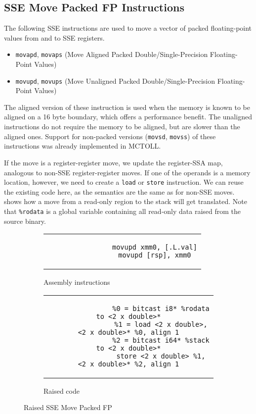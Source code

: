 \subsection{SSE Move Packed FP Instructions}\label{subsec:sse-move-packed-fp-instructions}

The following SSE instructions are used to move a vector of packed floating-point values from and to SSE registers.

\begin{itemize}
    \item \texttt{movapd}, \texttt{movaps} (Move Aligned Packed Double/Single-Precision Floating-Point Values)
    \item \texttt{movupd}, \texttt{movups} (Move Unaligned Packed Double/Single-Precision Floating-Point Values)
\end{itemize}

The aligned version of these instruction is used when the memory is known to be aligned on a 16 byte boundary, which offers a performance benefit.
The unaligned instructions do not require the memory to be aligned, but are slower than the aligned ones.
Support for non-packed versions (\texttt{movsd}, \texttt{movss}) of these instructions was already implemented in MCTOLL.

If the move is a register-register move, we update the register-SSA map, analogous to non-SSE register-register moves.
If one of the operands is a memory location, however, we need to create a \texttt{load} or \texttt{store} instruction.
We can reuse the existing code here, as the semantics are the same as for non-SSE moves.
 shows how a move from a read-only region to the stack will get translated.
Note that \texttt{\%rodata} is a global variable containing all read-only data raised from the source binary.

\begin{figure}[htpb]
    \centering
    \begin{subfigure}{.25\textwidth}
        \begin{tabular}{c}
            \begin{lstlisting}
                movupd xmm0, [.L.val]
                movupd [rsp], xmm0
            \end{lstlisting}
        \end{tabular}
        \caption{Assembly instructions}
    \end{subfigure}
    \hfill%
    \begin{subfigure}{.65\textwidth}
        \begin{tabular}{c}
            \begin{lstlisting}
                %0 = bitcast i8* %rodata to <2 x double>*
                %1 = load <2 x double>, <2 x double>* %0, align 1
                %2 = bitcast i64* %stack to <2 x double>*
                store <2 x double> %1, <2 x double>* %2, align 1
            \end{lstlisting}
        \end{tabular}
        \caption{Raised code}
    \end{subfigure}
    \caption{Raised SSE Move Packed FP}
    \label{fig:raised-fp-movupd}
\end{figure}

